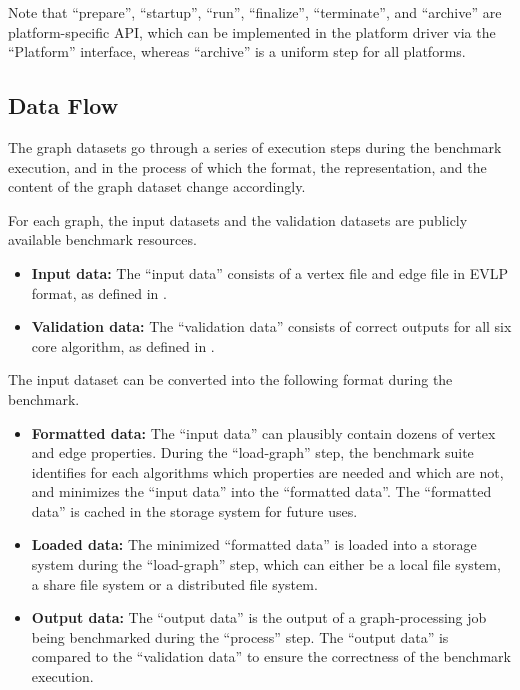 Note that ``prepare'', ``startup'', ``run'', ``finalize'', ``terminate'', and ``archive'' are platform-specific API, which can be implemented in the platform driver via the ``Platform'' interface, whereas ``archive'' is a uniform step for all platforms.  


\subsection{Data Flow}
\label{sec:process:execution:data_flow}
The graph datasets go through a series of execution steps during the benchmark execution, and in the process of which the format, the representation, and the content of the graph dataset change accordingly.

For each graph, the input datasets and the validation datasets are publicly available benchmark resources.

\begin{itemize} 
    \item \textbf{Input data:} The ``input data'' consists of a vertex file and edge file in EVLP format, as defined in .
    \item \textbf{Validation data:} The ``validation data'' consists of correct outputs for all six core algorithm, as defined in .
\end{itemize}

The input dataset can be converted into the following format during the benchmark.

\begin{itemize}
    \item \textbf{Formatted data:} The ``input data'' can plausibly contain dozens of vertex and edge properties. During the ``load-graph'' step, the benchmark suite identifies for each algorithms which properties are needed and which are not, and minimizes the ``input data'' into the ``formatted data''. The ``formatted data'' is cached in the storage system for future uses. 
    \item \textbf{Loaded data:} The minimized ``formatted data'' is loaded into a storage system during the ``load-graph'' step, which can either be a local file system, a share file system or a distributed file system.
    \item \textbf{Output data:} The ``output data'' is the output of a graph-processing job being benchmarked during the ``process'' step. The ``output data'' is compared to the ``validation data'' to ensure the correctness of the benchmark execution.
\end{itemize}



